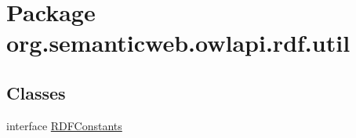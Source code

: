 \hypertarget{namespaceorg_1_1semanticweb_1_1owlapi_1_1rdf_1_1util}{\section{Package org.\-semanticweb.\-owlapi.\-rdf.\-util}
\label{namespaceorg_1_1semanticweb_1_1owlapi_1_1rdf_1_1util}
}
\subsection*{Classes}
\begin{DoxyCompactItemize}
\item 
interface \hyperlink{interfaceorg_1_1semanticweb_1_1owlapi_1_1rdf_1_1util_1_1_r_d_f_constants}{R\-D\-F\-Constants}
\end{DoxyCompactItemize}
